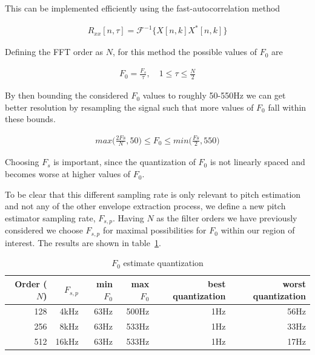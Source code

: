 \documentclass [11pt, proquest,oneside] {ganter_thesis}[2015/03/03]
\begin{document}
This can be implemented efficiently using the fast-autocorrelation method

\begin{align}
R_{xx}[n,\tau] = \mathcal{F}^{-1}\Big\{X[n,k]X^*[n,k]\Big\}
\end{align}

Defining the FFT order as $N$, for this method the possible values of $F_0$ are 

\begin{align}
F_0 = \frac{F_s}{\tau}, \quad 1 \leq \tau \leq \frac{N}{2}
\end{align}

By then bounding the considered $F_0$ values to roughly 50-550Hz we can get better resolution by resampling the signal such that more values of $F_0$ fall within these bounds.

\begin{align}
max\Big(\frac{2Fs}{N}, 50\Big) \leq F_0 \leq min\Big(\frac{Fs}{2}, 550\Big)
\end{align}

Choosing $F_s$ is important, since the quantization of $F_0$ is not linearly spaced and becomes worse at higher values of $F_0$.

To be clear that this different sampling rate is only relevant to pitch estimation and not any of the other envelope extraction process, we define a new pitch estimator sampling rate, $F_{s,p}$.  Having $N$ as the filter orders we have previously considered we choose $F_{s,p}$ for maximal possibilities for $F_0$ within our region of interest.  The results are shown in table~\ref{table:f0_quantization}.

\begin{table}
\begin{center}
\begin{tabular}{| r | r | r | r | r | r |}
  \hline
  \textbf{Order ($N$)} & \textbf{$F_{s,p}$} &  \textbf{min $F_0$} & \textbf{max $F_0$} &  \textbf{best quantization} &  \textbf{worst quantization} \\ \hline
  128 & 4kHz & 63Hz & 500Hz & 1Hz & 56Hz \\ \hline
  256 & 8kHz & 63Hz & 533Hz & 1Hz & 33Hz \\ \hline
  512 & 16kHz & 63Hz & 533Hz & 1Hz & 17Hz \\ \hline
\end{tabular}
\end{center}
\caption{$F_0$ estimate quantization}\label{table:f0_quantization}
\end{table}
\end{document}
